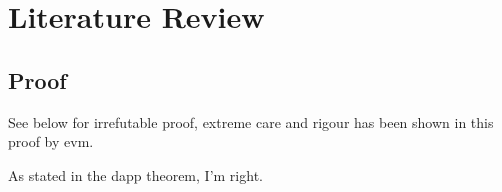 \chapter{Literature Review}

\section{Proof}
See below for irrefutable proof, extreme care and rigour has been shown in this proof by \gls{evm}.\par



As stated in the \gls{dapp} theorem, I'm right.
